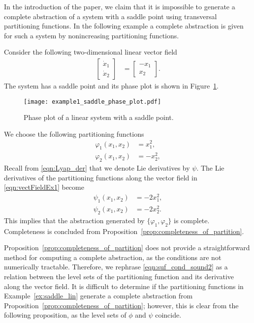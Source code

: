In the introduction of the paper, we claim that it is impossible to generate a complete abstraction of a system with a saddle point using transversal partitioning functions. In the following example a complete abstraction is given for such a system by nonincreasing partitioning functions.

\begin{example}\label{ex:saddle_lin}
Consider the following two-dimensional linear vector field
\begin{align}
\begin{bmatrix}
\dot{x}_1\\
\dot{x}_2
\end{bmatrix}&=
\begin{bmatrix}
-x_1\\
x_2
\end{bmatrix}\label{eqn:vectFieldEx1}.
\end{align}
The system has a saddle point and its phase plot is shown in Figure~\ref{fig:example1_saddle_phase_plot}.
\begin{figure}[!htb]
    \centering
       \texttt{[image: example1\_saddle\_phase\_plot.pdf]}
    \caption{Phase plot of a linear system with a saddle point.\label{fig:example1_saddle_phase_plot}}
\end{figure}

We choose the following partitioning functions
\begin{subequations}
\begin{align}
\varphi_{1}(x_1,x_2) &= x_1^2,\\
\varphi_{2}(x_1,x_2) &= -x_2^2,
\end{align}
\end{subequations}
Recall from \eqref{eqn:Lyap_der} that we denote Lie derivatives by $\psi$. The Lie derivatives of the partitioning functions along the vector field in \eqref{eqn:vectFieldEx1} become
\begin{subequations}
\begin{align}
\psi_{1}(x_1,x_2) &= -2x_1^2,\\
\psi_{2}(x_1,x_2) &= -2x_2^2.
\end{align}
\end{subequations}
This implies that the abstraction generated by $\{\varphi_{1},\varphi_{2}\}$ is complete. Completeness is concluded from Proposition~\ref{prop:completeness_of_partition}.
\end{example}

Proposition~\ref{prop:completeness_of_partition} does not provide a straightforward method for computing a complete abstraction, as the conditions are not numerically tractable. Therefore, we rephrase \eqref{eqn:suf_cond_sound2} as a relation between the level sets of the partitioning function and its derivative along the vector field.
It is difficult to determine if the partitioning functions in Example~\ref{ex:saddle_lin} generate a complete abstraction from Proposition~\ref{prop:completeness_of_partition}; however, this is clear from the following proposition, as the level sets of $\phi$ and $\psi$ coincide.






